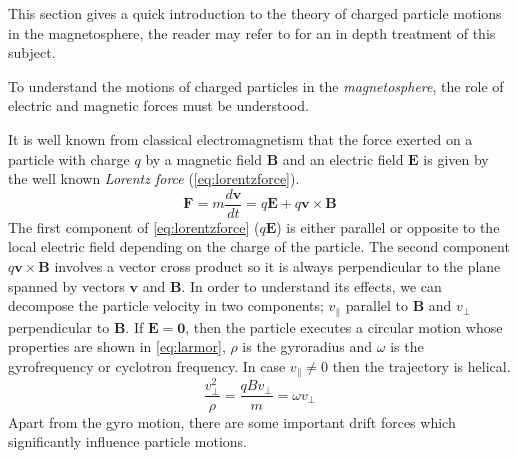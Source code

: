 This section gives a quick introduction to the theory of charged particle motions in the magnetosphere, the reader 
may refer to \citet{roederer2012dynamics} for an in depth treatment of this subject.

To understand the motions of charged particles in the \emph{magnetosphere}, the role of electric and magnetic 
forces must be understood.

It is well known from classical electromagnetism that the force exerted on a particle with charge $q$ by a 
magnetic field $\mathbf{B}$ and an electric field $\mathbf{E}$ is given by the well known \emph{Lorentz force} 
(\cref{eq:lorentzforce}).
%
\begin{equation}\label{eq:lorentzforce}
    \mathbf{F} = m\frac{d\mathbf{v}}{dt} = q\mathbf{E} + q\mathbf{v} \times \mathbf{B}
\end{equation}
%
The first component of \cref{eq:lorentzforce} ($q\mathbf{E}$) is either parallel or opposite to the local electric 
field depending on the charge of the particle. The second component $q\mathbf{v} \times \mathbf{B}$ involves a vector 
cross product so it is always perpendicular to the plane spanned by vectors $\mathbf{v}$ and $\mathbf{B}$. In order to 
understand its effects, we can decompose the particle velocity in two components; $v_{\parallel}$ parallel to $\mathbf{B}$ and 
$v_{\perp}$ perpendicular to $\mathbf{B}$. If $\mathbf{E} = \mathbf{0}$, then the particle executes a circular motion 
whose properties are shown in \cref{eq:larmor}, $\rho$ is the gyroradius and $\omega$ is the gyrofrequency or 
cyclotron frequency. In case $v_{\parallel} \neq 0$ then the trajectory is helical.
%
\begin{equation}\label{eq:larmor}
    \frac{v^{2}_{\perp}}{\rho} = \frac{qBv_{\perp}}{m} = \omega v_{\perp}
\end{equation}
%
Apart from the gyro motion, there are some important drift forces which significantly influence particle motions.

